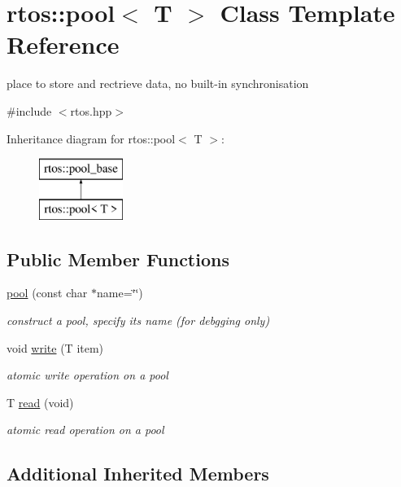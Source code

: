 \hypertarget{classrtos_1_1pool}{}\section{rtos\+:\+:pool$<$ T $>$ Class Template Reference}
\label{classrtos_1_1pool}


place to store and rectrieve data, no built-\/in synchronisation  




{\ttfamily \#include $<$rtos.\+hpp$>$}

Inheritance diagram for rtos\+:\+:pool$<$ T $>$\+:\begin{figure}[H]
\begin{center}
\leavevmode
\includegraphics[height=2.000000cm]{classrtos_1_1pool}
\end{center}
\end{figure}
\subsection*{Public Member Functions}
\begin{DoxyCompactItemize}
\item 
\hyperlink{classrtos_1_1pool_a5112915f2ae720f6f49972bef2668a6d}{pool} (const char $\ast$name=\char`\"{}\char`\"{})
\begin{DoxyCompactList}\small\item\em construct a pool, specify its name (for debgging only) \end{DoxyCompactList}\item 
void \hyperlink{classrtos_1_1pool_a9a6f29c8b3daf17064e22ec4c4a47dfa}{write} (T item)
\begin{DoxyCompactList}\small\item\em atomic write operation on a pool \end{DoxyCompactList}\item 
T \hyperlink{classrtos_1_1pool_ad3e243cb97b89b891f3683dce82cafd8}{read} (void)
\begin{DoxyCompactList}\small\item\em atomic read operation on a pool \end{DoxyCompactList}\end{DoxyCompactItemize}
\subsection*{Additional Inherited Members}



